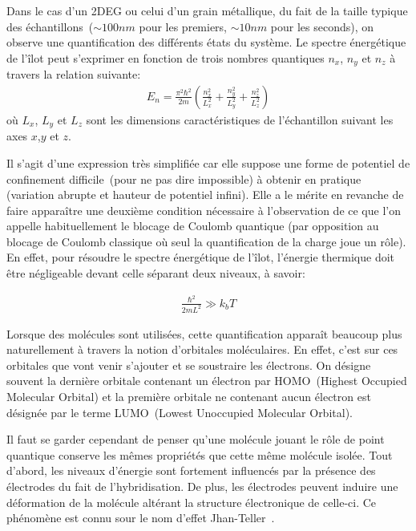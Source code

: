 Dans le cas d'un 2DEG ou celui d'un grain métallique, du fait de la taille typique des échantillons~($\sim 100nm$ pour les premiers, $\sim 10nm$ pour les seconds), on observe une quantification des différents états du système. Le spectre énergétique de l'\^ilot peut s'exprimer en fonction de trois nombres quantiques $n_x$, $n_y$ et $n_z$ à travers la relation suivante:
\begin{eqnarray}
E_n = \frac{\pi^2 \hbar^2}{2m}(\frac{n_x^2}{L_x^2} + \frac{n_y^2}{L_y^2} + \frac{n_z^2}{L_z^2}) \nonumber
\end{eqnarray}
où $L_x$, $L_y$ et $L_z$ sont les dimensions caractéristiques de l'échantillon suivant les axes $x$,$y$ et $z$.

Il s'agit d'une expression très simplifiée car elle suppose une forme de potentiel de confinement difficile~(pour ne pas dire impossible) à obtenir en pratique (variation abrupte et hauteur de potentiel infini). Elle a le mérite en revanche de faire appara\^itre une deuxième condition nécessaire à l'observation de ce que l'on appelle habituellement le blocage de Coulomb quantique (par opposition au blocage de Coulomb classique où seul la quantification de la charge joue un rôle). En effet, pour résoudre le spectre énergétique de l'\^ilot, l'énergie thermique doit \^etre négligeable devant celle séparant deux niveaux, à savoir:

\begin{eqnarray}
\frac{\hbar^2}{2mL^2} \gg k_bT \nonumber
\end{eqnarray}

Lorsque des molécules sont utilisées, cette quantification apparaît beaucoup plus naturellement à travers la notion d'orbitales moléculaires. En effet, c'est sur ces orbitales que vont venir s'ajouter et se soustraire les électrons. On désigne souvent la dernière orbitale contenant un électron par HOMO~(Highest Occupied Molecular Orbital) et la première orbitale ne contenant aucun électron est désignée par le terme LUMO~(Lowest Unoccupied Molecular Orbital).

Il faut se garder cependant de penser qu'une molécule jouant le r\^ole de point quantique conserve les mêmes propriétés que cette m\^eme molécule isolée. Tout d'abord, les niveaux d'énergie sont fortement influencés par la présence des électrodes du fait de l'hybridisation. De plus, les électrodes peuvent induire une déformation de la molécule altérant la structure électronique de celle-ci. Ce phénomène est connu sour le nom d'effet Jhan-Teller~\cite{Jahn1937}. 


